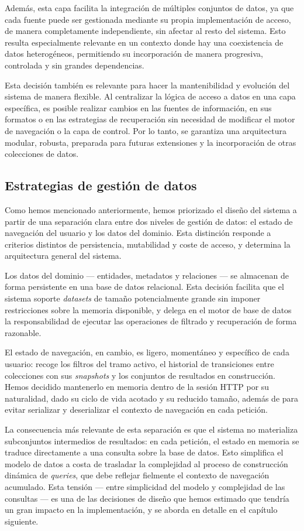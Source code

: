 Además, esta capa facilita la integración de múltiples conjuntos de datos, ya que cada fuente puede ser gestionada
mediante su propia implementación de acceso, de manera completamente independiente, sin afectar al resto del sistema.
Esto resulta especialmente relevante en un contexto donde hay una coexistencia de datos heterogéneos, permitiendo
su incorporación de manera progresiva, controlada y sin grandes dependencias.

Esta decisión también es relevante para hacer la mantenibilidad y evolución del sistema de manera flexible. Al centralizar
la lógica de acceso a datos en una capa específica, es posible realizar cambios en las fuentes de información,
en sus formatos o en las estrategias de recuperación sin necesidad de modificar el motor de navegación o la
capa de control. Por lo tanto, se garantiza una arquitectura modular, robusta, preparada para futuras extensiones y 
la incorporación de otras colecciones de datos.

    \subsection*{Estrategias de gestión de datos}

Como hemos mencionado anteriormente, hemos priorizado el diseño del sistema a partir de una separación clara entre dos niveles de
gestión de datos: el estado de navegación del usuario y los datos del dominio. Esta distinción responde a criterios
distintos de persistencia, mutabilidad y coste de acceso, y determina la arquitectura general del sistema.

Los datos del dominio --- entidades, metadatos y relaciones --- se almacenan de forma persistente
en una base de datos relacional. Esta decisión facilita que el sistema soporte \textit{datasets} de tamaño
potencialmente grande sin imponer restricciones sobre la memoria disponible, y delega en el motor de base
de datos la responsabilidad de ejecutar las operaciones de filtrado y recuperación de forma
razonable.

El estado de navegación, en cambio, es ligero, momentáneo y específico de cada usuario: recoge los
filtros del tramo activo, el historial de transiciones entre colecciones con sus \textit{snapshots} y los
conjuntos de resultados en construcción. Hemos decidido mantenerlo en memoria dentro de la sesión HTTP por su naturalidad,
dado su ciclo de vida acotado y su reducido tamaño, además de para evitar serializar y deserializar el contexto de
navegación en cada petición.

La consecuencia más relevante de esta separación es que el sistema no materializa subconjuntos
intermedios de resultados: en cada petición, el estado en memoria se traduce directamente a una
consulta sobre la base de datos. Esto simplifica el modelo de datos a costa de trasladar la
complejidad al proceso de construcción dinámica de \textit{queries}, que debe reflejar fielmente el
contexto de navegación acumulado. Esta tensión --- entre simplicidad del modelo y complejidad de
las consultas --- es una de las decisiones de diseño que hemos estimado que tendría un gran impacto en la implementación,
y se aborda en detalle en el capítulo siguiente.